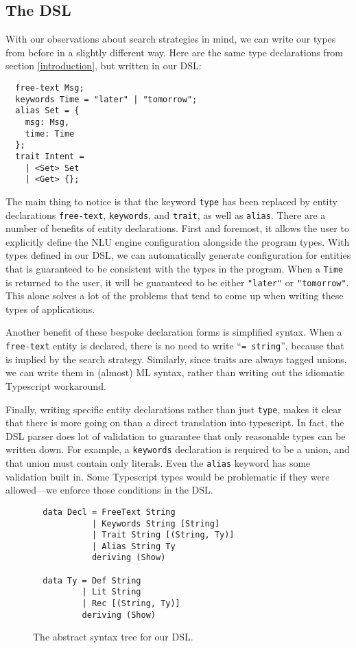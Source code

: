 \documentclass[twocolumn]{article}
\newcommand{\ts}[1]{\texttt{#1}}
\begin{document}
\subsection{The DSL}
With our observations about search strategies in mind, we can write our types
from before in a slightly different way. Here are the same type declarations
from section \ref{introduction}, but written in our DSL:
\begin{verbatim}
  free-text Msg;
  keywords Time = "later" | "tomorrow";
  alias Set = {
    msg: Msg,
    time: Time
  };
  trait Intent =
    | <Set> Set
    | <Get> {};
\end{verbatim}

The main thing to notice is that the keyword \ts{type} has been replaced by
entity declarations \ts{free-text}, \ts{keywords}, and \ts{trait}, as well as
\ts{alias}. There are a number of benefits of entity declarations. First and
foremost, it allows the user to explicitly define the NLU engine configuration
alongside the program types. With types defined in our DSL, we can automatically
generate configuration for entities that is guaranteed to be consistent with the
types in the program. When a \ts{Time} is returned to the user, it will be
guaranteed to be either \ts{"later"} or \ts{"tomorrow"}. This alone solves a lot
of the problems that tend to come up when writing these types of applications.

Another benefit of these bespoke declaration forms is simplified syntax. When a
\ts{free-text} entity is declared, there is no need to write ``\ts{= string}'',
because that is implied by the search strategy. Similarly, since traits are
always tagged unions, we can write them in (almost) ML syntax, rather than
writing out the idiomatic Typescript workaround.

Finally, writing specific entity declarations rather than just \ts{type}, makes
it clear that there is more going on than a direct translation into typescript.
In fact, the DSL parser does lot of validation to guarantee that only reasonable
types can be written down. For example, a \ts{keywords} declaration is required
to be a union, and that union must contain only literals. Even the \ts{alias}
keyword has some validation built in. Some Typescript types would be problematic
if they were allowed---we enforce those conditions in the DSL.

\begin{figure}
\begin{verbatim}
  data Decl = FreeText String
            | Keywords String [String]
            | Trait String [(String, Ty)]
            | Alias String Ty
            deriving (Show)

  data Ty = Def String
          | Lit String
          | Rec [(String, Ty)]
          deriving (Show)
\end{verbatim}
  \caption{The abstract syntax tree for our DSL.}
  \label{fig:ast}
\end{figure}
\end{document}

